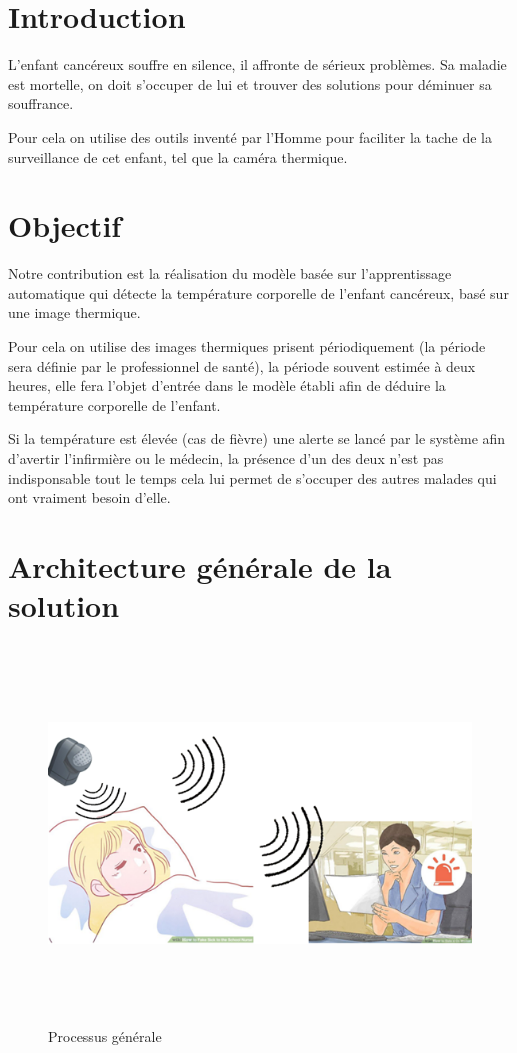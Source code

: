 \documentclass[12pt]{article}
\begin{document}
\tableofcontents
\thispagestyle{empty}
\cleardoublepage

\setcounter{page}{1}
\section{Introduction}
L’enfant cancéreux souffre en silence, il affronte de sérieux problèmes. Sa maladie est mortelle, on doit s’occuper de lui et trouver des solutions pour déminuer sa souffrance.

Pour cela on utilise des outils inventé par l'Homme pour faciliter la tache de la surveillance de cet 
enfant, tel que la caméra thermique.
\section{Objectif}
Notre contribution est la réalisation du modèle basée sur l’apprentissage automatique qui détecte la température corporelle de l'enfant cancéreux, basé sur une image thermique.

Pour cela on utilise des images thermiques prisent périodiquement (la période sera définie par le professionnel de santé), la période souvent estimée à deux heures, elle fera l’objet d’entrée dans le modèle établi afin de déduire la température corporelle de l’enfant.

Si la température est élevée (cas de fièvre) une alerte se lancé par le système afin d’avertir l'infirmière ou le médecin, la présence d'un des deux n'est pas indisponsable tout le temps cela lui permet de s’occuper des autres malades qui ont vraiment besoin d’elle.
\section{Architecture générale de la solution}
\begin{figure}[h]
	\centering
	\includegraphics[height=10cm,width=15cm]{img-Chapiter-3/processus.png}
	\caption{Processus générale}
\end{figure}
\newpage
\end{document}
